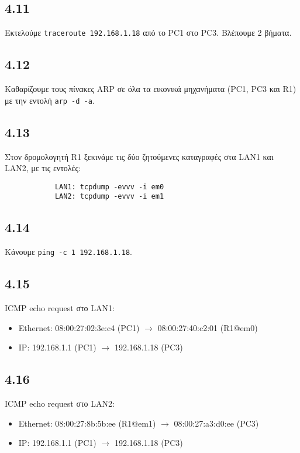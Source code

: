 \documentclass[a4paper, 12pt]{article}
\begin{document}
	\subsection*{4.11}
		Εκτελούμε \verb|traceroute 192.168.1.18| από το PC1 στο PC3. Βλέπουμε 2 βήματα.

	\subsection*{4.12}
		Καθαρίζουμε τους πίνακες ARP σε όλα τα εικονικά μηχανήματα (PC1, PC3 και R1) με την εντολή \verb|arp -d -a|.

	\subsection*{4.13}
		Στον δρομολογητή R1 ξεκινάμε τις δύο ζητούμενες καταγραφές στα LAN1 και LAN2, με τις εντολές: 
		
		\begin{verbatim}
			LAN1: tcpdump -evvv -i em0
			LAN2: tcpdump -evvv -i em1
		\end{verbatim}

	\subsection*{4.14}
		Κάνουμε \verb|ping -c 1 192.168.1.18|.

	\subsection*{4.15}
		ICMP echo request στο LAN1:
		
		\begin{itemize}
			\item Ethernet: 08:00:27:02:3e:c4 (PC1) $\rightarrow$ 08:00:27:40:c2:01 (R1@em0)
			\item IP: 192.168.1.1 (PC1) $\rightarrow$ 192.168.1.18 (PC3)
		\end{itemize}

	\subsection*{4.16}
		ICMP echo request στο LAN2:
		
		\begin{itemize}
			\item Ethernet: 08:00:27:8b:5b:ee (R1@em1) $\rightarrow$ 08:00:27:a3:d0:ee (PC3)  
			\item IP: 192.168.1.1 (PC1) $\rightarrow$ 192.168.1.18 (PC3)
		\end{itemize}
\end{document}
